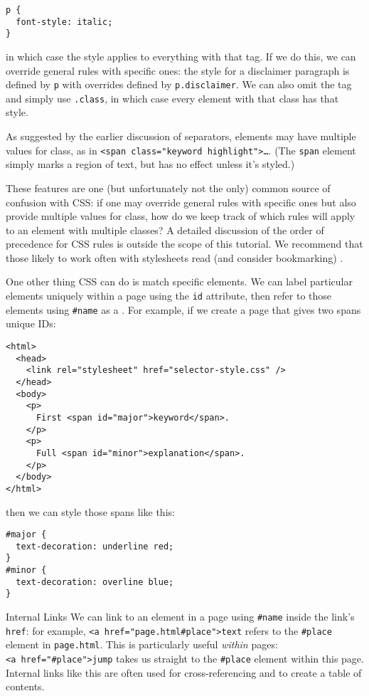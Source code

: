 \begin{verbatim}
p {
  font-style: italic;
}
\end{verbatim}

\noindent
in which case the style applies to everything with that tag.
If we do this,
we can override general rules with specific ones:
the style for a disclaimer paragraph is defined by \texttt{p} with overrides defined by \texttt{p.disclaimer}.
We can also omit the tag and simply use \texttt{.class},
in which case every element with that class has that style.

As suggested by the earlier discussion of separators,
elements may have multiple values for class,
as in \texttt{{\textless}span\ class="keyword\ highlight"{\textgreater}{\ldots}}.
(The \texttt{span} element simply marks a region of text,
but has no effect unless it's styled.)

These features are one
(but unfortunately not the only)
common source of confusion with CSS:
if one may override general rules with specific ones
but also provide multiple values for class,
how do we keep track of which rules will apply to an element with multiple classes?
A detailed discussion of the order of precedence for CSS rules
is outside the scope of this tutorial. We recommend that those
likely to work often with stylesheets read (and consider bookmarking)
.

One other thing CSS can do is match specific elements.
We can label particular elements uniquely within a page using the \texttt{id} attribute,
then refer to those elements using \texttt{\#name} as a .
For example,
if we create a page that gives two spans unique IDs:

\begin{verbatim}
<html>
  <head>
    <link rel="stylesheet" href="selector-style.css" />
  </head>
  <body>
    <p>
      First <span id="major">keyword</span>.
    </p>
    <p>
      Full <span id="minor">explanation</span>.
    </p>
  </body>
</html>
\end{verbatim}

\noindent
then we can style those spans like this:

\begin{verbatim}
#major {
  text-decoration: underline red;
}
#minor {
  text-decoration: overline blue;
}
\end{verbatim}

\begin{aside}{Internal Links}
  We can link to an element in a page using \texttt{\#name}
  inside the link's \texttt{href}:
  for example,
  \texttt{{\textless}a\ href="page.html\#place"{\textgreater}text}
  refers to the \texttt{\#place} element in \texttt{page.html}.
  This is particularly useful \emph{within} pages:
  \texttt{{\textless}a\ href="\#place"{\textgreater}jump}
  takes us straight to the \texttt{\#place} element within this page.
  Internal links like this are often used for cross-referencing and to create a table of contents.
\end{aside}

